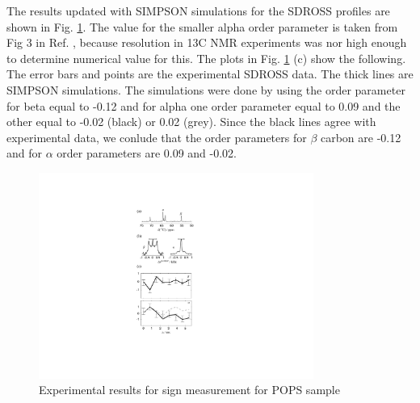\documentclass[aps,prl,superscriptaddress,twocolumn]{revtex4}
\begin{document}
The results updated with SIMPSON simulations for the SDROSS profiles
are shown in Fig. \ref{PShgSIGNSsimpson}. The value for the smaller
alpha order parameter is taken from Fig 3 in Ref. ,
because resolution in 13C NMR experiments was nor high enough to determine
numerical value for this. The plots in Fig. \ref{PShgSIGNSsimpson} (c) show
the following. The error bars and points are the experimental SDROSS data.
The thick lines are SIMPSON simulations. The simulations were done by using
the order parameter for beta equal to -0.12 and for alpha one order parameter
equal to 0.09 and the other equal to -0.02 (black) or 0.02 (grey).
Since the black lines agree with experimental data, we conlude that
the order parameters for $\beta$ carbon are -0.12 and for $\alpha$
order parameters are 0.09 and -0.02.
\begin{figure}[]
  \centering
  \includegraphics[width=9.0cm]{../Figs/PShgSIGNSsimpson.pdf}
  \caption{\label{PShgSIGNSsimpson}
    Experimental results for sign measurement for POPS sample
  }
\end{figure}




\listoftodos
\end{document}
